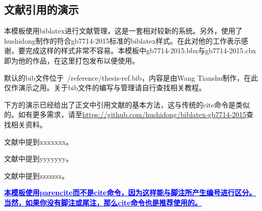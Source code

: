 \subsection{文献引用的演示}
\par 本模板使用biblatex进行文献管理，这是一套相对较新的系统。另外，使用了hushidong制作的符合gb7714-2015标准的biblatex样式。在此对他的工作表示感谢，要完成这样的样式非常不容易。本模板中gb7714-2015.bbx与gb7714-2015.cbx即为他的作品，在这里打包发布以便使用。
\par 默认的bib文件位于~/reference/thesis-ref.bib，内容是由Wang Tianshu制作，在此仅作演示之用。关于bib文件的编写与管理请自行查找相关教程。
\par 下方的演示已经给出了正文中引用文献的基本方法，这与传统的cite命令是类似的。如有更多需求，请至\url{https://github.com/hushidong/biblatex-gb7714-2015}查找相关资料。
\par 文献\parencite{Yang_Hy200215}中提到xxxxxxx。
\par 文献\parencite{Joa1999}中提到yyyyyyy。
\par 文献\parencite{Altman1997}中提到zzzzzzz。
\par \textcolor{blue}{\textbf{\uline{本模板使用parencite而不是cite命令，因为这样能与脚注所产生编号进行区分。当然，如果你没有脚注或尾注，那么cite命令也是推荐使用的。}}}